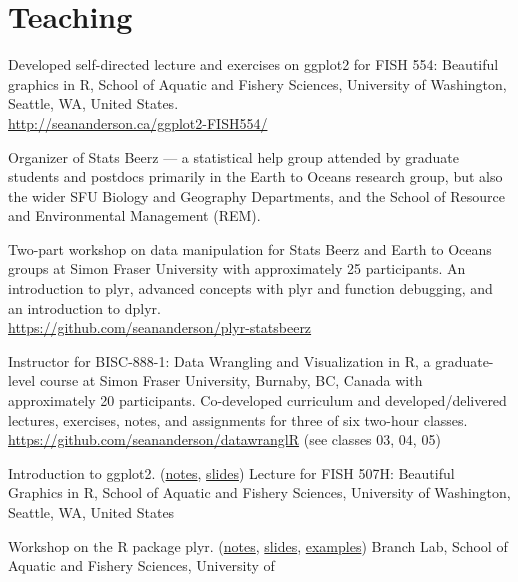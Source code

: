 \section{Teaching}\label{teaching}

\begin{description}
\itemsep3pt\parskip0pt
\item[2014--15]
Developed self-directed lecture and exercises on ggplot2 for FISH 554:
Beautiful graphics in R, School of Aquatic and Fishery Sciences,
University of Washington, Seattle, WA, United States.\\
\url{http://seananderson.ca/ggplot2-FISH554/}
\item[2013--14]
Organizer of Stats Beerz --- a statistical help group attended by
graduate students and postdocs primarily in the Earth to Oceans research
group, but also the wider SFU Biology and Geography Departments, and the
School of Resource and Environmental Management (REM).
\item[2013]
Two-part workshop on data manipulation for Stats Beerz and Earth to
Oceans groups at Simon Fraser University with approximately 25
participants. An introduction to plyr, advanced concepts with plyr and
function debugging, and an introduction to dplyr.\\
\url{https://github.com/seananderson/plyr-statsbeerz}
\item[2013]
Instructor for BISC-888-1: Data Wrangling and Visualization in R, a
graduate-level course at Simon Fraser University, Burnaby, BC, Canada
with approximately 20 participants. Co-developed curriculum and
developed/delivered lectures, exercises, notes, and assignments for
three of six two-hour classes.\\
\url{https://github.com/seananderson/datawranglR} (see classes 03, 04,
05)
\item[2012]
Introduction to ggplot2.
(\href{http://seananderson.ca/courses/12-ggplot2/ggplot2_notes.pdf}{notes},
\href{http://seananderson.ca/courses/12-ggplot2/ggplot2_slides_with_examples.pdf}{slides})
Lecture for FISH 507H: Beautiful Graphics in R, School of Aquatic and
Fishery Sciences, University of Washington, Seattle, WA, United States
\item[2012]
Workshop on the R package plyr.
(\href{http://seananderson.ca/courses/12-plyr/plyr_2012.pdf}{notes},
\href{http://seananderson.ca/courses/12-plyr/plyr_2012_slides.pdf}{slides},
\href{http://seananderson.ca/courses/12-plyr/plyr_2012_examples.html}{examples})
Branch Lab, School of Aquatic and Fishery Sciences, University of

\end{description}

